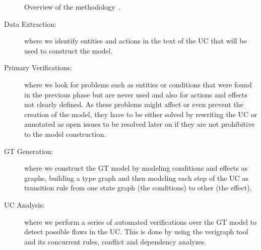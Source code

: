 \begin{figure}[!ht]
  \centering
  \caption{Overview of the methodology~\cite{Junior2015}.}\label{fig:tests:methodology}
\end{figure}

\begin{description}
  \item[Data Extraction:] where we identify entities and actions in the text of the UC that will be used to construct the model.
  \item[Primary Verifications:] where we look for problems such as entities or conditions that were found in the previous phase but are never used and also for actions and effects not clearly defined. As these problems might affect or even prevent the creation of the model, they have to be either solved by rewriting the UC or annotated as open issues to be resolved later on if they are not prohibitive to the model construction.
  \item[GT Generation:] where we construct the GT model by modeling conditions and effects as graphs, building a type graph and then modeling each step of the UC as transition rule from one state graph (the conditions) to other (the effect).
  \item[UC Analysis:] where we perform a series of automated verifications over the GT model to detect possible flaws in the UC. This is done by using the verigraph tool  and its concurrent rules, conflict and dependency analyzes.
\end{description}


